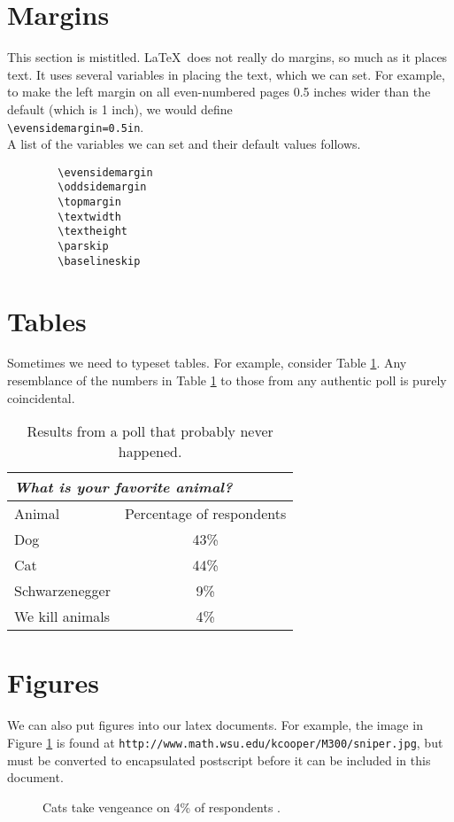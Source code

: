 \documentclass[UTF8]{article}
\begin{document}
	\section{Margins}
	This section is mistitled.  \LaTeX\ does not really do margins,
	so much as it places text.  It uses several variables in placing the
	text, which we can set.  For example, to make the left margin on
	all even-numbered pages 0.5 inches wider than the default (which is 
	1 inch), we would define\\
	\verb(\evensidemargin=0.5in(.\\
	A list of the variables we can set and their default values follows.
	\begin{verbatim}
		\evensidemargin
		\oddsidemargin
		\topmargin
		\textwidth
		\textheight
		\parskip
		\baselineskip
	\end{verbatim}
	
	\section{Tables}
	Sometimes we need to typeset tables.  For example, 
	consider Table \ref{animaltable}.  
	Any resemblance of the numbers in 
	Table \ref{animaltable} to those from any authentic poll is purely coincidental.
	\begin{table}
		\begin{center}
			\caption{\label{animaltable}
				Results from a poll that probably never happened.}
			\begin{tabular}{||l|c||}
				\hline
				\cline{1-2}
				\multicolumn{2}{||l||}{{\it What is your favorite animal?}}\\
				\hline
				Animal & Percentage of respondents\\
				\hline
				Dog & 43\%\\
				Cat & 44\%\\
				Schwarzenegger & 9\%\\
				We kill animals & 4\%\\
				\hline
				\hline
			\end{tabular}
		\end{center}
	\end{table}
	
	\section{Figures}
	We can also put figures into our latex documents.  For example, the
	image in Figure \ref{sniper} is found at 
	{\tt http://www.math.wsu.edu/kcooper/M300/sniper.jpg}, but must
	be converted to encapsulated postscript before it can be included
	in this document.
	\begin{figure}[ht]
		\begin{center}
			\caption{\label{sniper}
				Cats take vengeance on 4\% of respondents \cite{calvin}.}
			\vfill
		\end{center}
	\end{figure}
	
\end{document}
